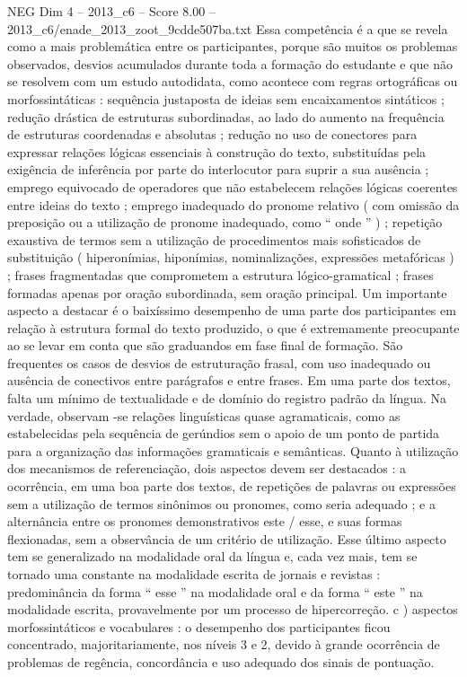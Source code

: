 \begin{textsample}{NEG Dim 4 – 2013\_c6 – Score 8.00 – 2013\_c6/enade\_2013\_zoot\_9cdde507ba.txt}
Essa competência é a que se revela como a mais problemática entre os participantes, porque são muitos os problemas observados, desvios acumulados durante toda a formação do estudante e que não se resolvem com um estudo autodidata, como acontece com regras ortográficas ou morfossintáticas : sequência justaposta de ideias sem encaixamentos sintáticos ; redução drástica de estruturas subordinadas, ao lado do aumento na frequência de estruturas coordenadas e absolutas ; redução no uso de conectores para expressar relações lógicas essenciais à construção do texto, substituídas pela exigência de inferência por parte do interlocutor para suprir a sua ausência ; emprego equivocado de operadores que não estabelecem relações lógicas coerentes entre ideias do texto ; emprego inadequado do pronome relativo ( com omissão da preposição ou a utilização de pronome inadequado, como “ onde ” ) ; repetição exaustiva de termos sem a utilização de procedimentos mais sofisticados de substituição ( hiperonímias, hiponímias, nominalizações, expressões metafóricas ) ; frases fragmentadas que comprometem a estrutura lógico-gramatical ; frases formadas apenas por oração subordinada, sem oração principal.
Um importante aspecto a destacar é o baixíssimo desempenho de uma parte dos participantes em relação à estrutura formal do texto produzido, o que é extremamente preocupante ao se levar em conta que são graduandos em fase final de formação.
São frequentes os casos de desvios de estruturação frasal, com uso inadequado ou ausência de conectivos entre parágrafos e entre frases.
Em uma parte dos textos, falta um mínimo de textualidade e de domínio do registro padrão da língua.
Na verdade, observam -se relações linguísticas quase agramaticais, como as estabelecidas pela sequência de gerúndios sem o apoio de um ponto de partida para a organização das informações gramaticais e semânticas.
Quanto à utilização dos mecanismos de referenciação, dois aspectos devem ser destacados : a ocorrência, em uma boa parte dos textos, de repetições de palavras ou expressões sem a utilização de termos sinônimos ou pronomes, como seria adequado ; e a alternância entre os pronomes demonstrativos este / esse, e suas formas flexionadas, sem a observância de um critério de utilização.
Esse último aspecto tem se generalizado na modalidade oral da língua e, cada vez mais, tem se tornado uma constante na modalidade escrita de jornais e revistas : predominância da forma “ esse ” na modalidade oral e da forma “ este ” na modalidade escrita, provavelmente por um processo de hipercorreção. c ) aspectos morfossintáticos e vocabulares : o desempenho dos participantes ficou concentrado, majoritariamente, nos níveis 3 e 2, devido à grande ocorrência de problemas de regência, concordância e uso adequado dos sinais de pontuação.

\end{textsample}
